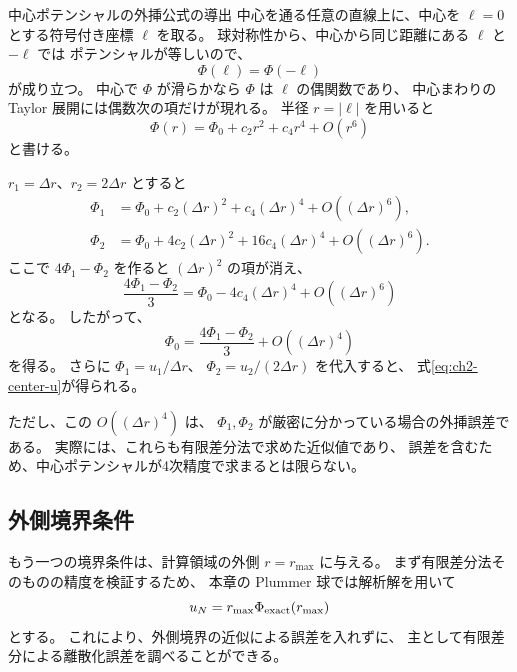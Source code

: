 \begin{topicblock}{中心ポテンシャルの外挿公式の導出}
中心を通る任意の直線上に、中心を $\ell=0$ とする符号付き座標 $\ell$ を取る。
球対称性から、中心から同じ距離にある $\ell$ と $-\ell$ では
ポテンシャルが等しいので、
\begin{equation}
 \Phi(\ell)=\Phi(-\ell)
\end{equation}
が成り立つ。
中心で $\Phi$ が滑らかなら $\Phi$ は $\ell$ の偶関数であり、
中心まわりの Taylor 展開には偶数次の項だけが現れる。
半径 $r=|\ell|$ を用いると
\begin{equation}
 \Phi(r)=\Phi_0+c_2r^2+c_4r^4+O(r^6)
\end{equation}
と書ける。

$r_1=\Delta r$、$r_2=2\Delta r$ とすると
\begin{align}
 \Phi_1&=\Phi_0+c_2(\Delta r)^2+c_4(\Delta r)^4+O((\Delta r)^6),\\
 \Phi_2&=\Phi_0+4c_2(\Delta r)^2+16c_4(\Delta r)^4+O((\Delta r)^6).
\end{align}
ここで $4\Phi_1-\Phi_2$ を作ると $(\Delta r)^2$ の項が消え、
\begin{equation}
 \frac{4\Phi_1-\Phi_2}{3}
 =\Phi_0-4c_4(\Delta r)^4+O((\Delta r)^6)
\end{equation}
となる。
したがって、
\begin{equation}
 \Phi_0
 =\frac{4\Phi_1-\Phi_2}{3}
 +O((\Delta r)^4)
\end{equation}
を得る。
さらに
$\Phi_1=u_1/\Delta r$、
$\Phi_2=u_2/(2\Delta r)$ を代入すると、
式\eqref{eq:ch2-center-u}が得られる。

ただし、この $O((\Delta r)^4)$ は、
$\Phi_1,\Phi_2$ が厳密に分かっている場合の外挿誤差である。
実際には、これらも有限差分法で求めた近似値であり、
誤差を含むため、中心ポテンシャルが4次精度で求まるとは限らない。
\end{topicblock}


\subsection{外側境界条件}

もう一つの境界条件は、計算領域の外側 $r=r_{\max}$ に与える。
まず有限差分法そのものの精度を検証するため、
本章の Plummer 球では解析解を用いて
\begin{equation}
 u_N
 =r_{\max}\Phi_{\rm exact}(r_{\max})
\label{eq:ch2-outer-exact}
\end{equation}
とする。
これにより、外側境界の近似による誤差を入れずに、
主として有限差分による離散化誤差を調べることができる。


